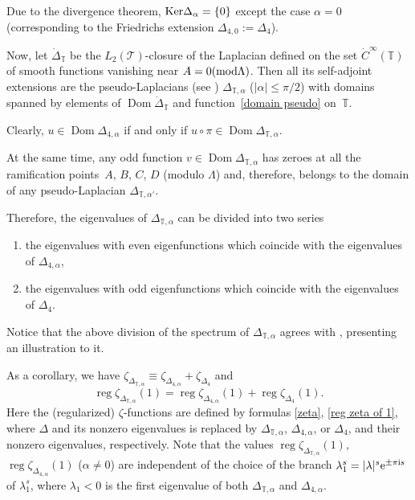 \documentclass[pdftex]{sigma}
\numberwithin{equation}{section}
\theoremstyle{definition}
\begin{document}
 Due to the divergence theorem, ${\rm Ker}\Delta_\alpha=\{0\}$ except the case $\alpha=0$ (corresponding to the Friedrichs extension $\Delta_{4,0}:=\Delta_4$).

Now, let $\dot{\Delta}_{\mathbb{T}}$ be the $L_2(\mathscr{T})$-closure of the Laplacian defined on the set $\dot{C}^{\infty}(\mathbb{T})$ of smooth functions vanishing near $A=0 ({\rm mod}\Lambda)$. Then all its self-adjoint extensions are the pseudo-Laplacians (see \cite{CdV}) $\Delta_{\mathbb{T},\alpha}$ ($|\alpha|\le\pi/2$) with domains spanned by elements of $\operatorname{Dom}\dot{\Delta}_{\mathbb{T}}$ and function~\eqref{domain pseudo} on~$\mathbb{T}$.

Clearly, $u\in\operatorname{Dom}\Delta_{4,\alpha}$ if and only if $u\circ\pi\in\operatorname{Dom}\Delta_{\mathbb{T},\alpha}$.

 At the same time, any odd function $v\in\operatorname{Dom}\Delta_{\mathbb{T},\alpha}$ has zeroes at all the ramification points~$A$, $B$, $C$, $D$ (modulo $\Lambda$) and, therefore, belongs to the domain of any pseudo-Laplacian $\Delta_{\mathbb{T},\alpha'}$.

Therefore, the eigenvalues of $\Delta_{\mathbb{T},\alpha}$ can be divided into two series
\begin{enumerate}\itemsep=0pt
\item[(1)] the eigenvalues with even eigenfunctions which coincide with the eigenvalues of $\Delta_{4,\alpha}$,
\item[(2)] the eigenvalues with odd eigenfunctions which coincide with the eigenvalues of $\Delta_{4}$.
\end{enumerate}

Notice that the above division of the spectrum of $\Delta_{\mathbb{T},\alpha}$ agrees with \cite[Theorem 2]{CdV}, presenting an illustration to it.

As a corollary, we have $\zeta_{\Delta_{\mathbb{T},\alpha}}\equiv\zeta_{\Delta_{4,\alpha}}+\zeta_{\Delta_4}$ and
\begin{equation}
\label{zetas pseudo}
\operatorname{reg}\zeta_{\Delta_{\mathbb{T},\alpha}}(1)=\operatorname{reg}\zeta_{\Delta_{4,\alpha}}(1)+\operatorname{reg}\zeta_{\Delta_{4}}(1).
\end{equation}
Here the (regularized) $\zeta$-functions are defined by formulas \eqref{zeta}, \eqref{reg zeta of 1}, where $\Delta$ and its nonzero eigenvalues is replaced by $\Delta_{\mathbb{T},\alpha}$, $\Delta_{4,\alpha}$, or $\Delta_4$, and their nonzero eigenvalues, respectively. Note that the values $\operatorname{reg}\zeta_{\Delta_{\mathbb{T},\alpha}}(1)$, $\operatorname{reg}\zeta_{\Delta_{4,\alpha}}(1)$ ($\alpha\ne 0$) are independent of the choice of the branch $\lambda_1^{s}=|\lambda|^s {\rm e}^{\pm\pi {\rm i} s}$ of $\lambda_1^{s}$, where $\lambda_1<0$ is the first eigenvalue of both $\Delta_{\mathbb{T},\alpha}$ and $\Delta_{4,\alpha}$.
\end{document}
